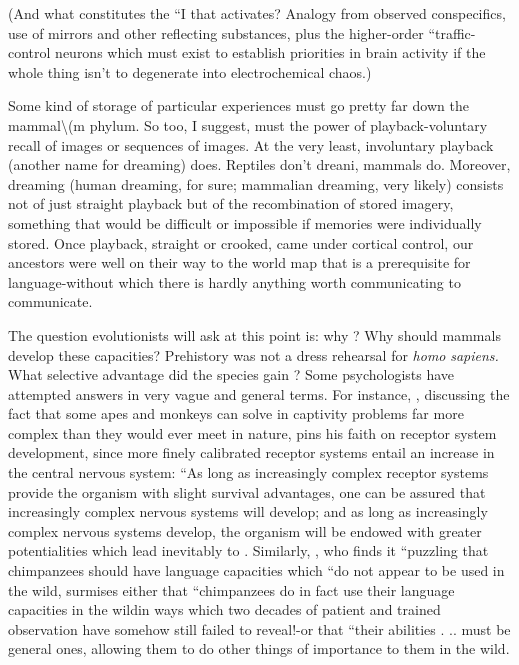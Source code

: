 (And what constitutes the ``I that activates? Analogy from observed conspecifics, use of mirrors and other reflecting substances, plus the higher-order ``traffic-control neurons which must exist to establish priorities in brain activity if the whole thing isn't to degen\-erate into electrochemical chaos.)

Some kind of  storage of particular experiences must go pretty far down the mammal{\textbackslash}(m phylum. So too, I suggest, must
the power of playback-voluntary recall of images or sequences of images. At the very least, involuntary playback (another name for dreaming) does. Reptiles don't dreani, mammals do. Moreover, dream\-ing (human dreaming, for sure; mammalian dreaming, very likely) consists not of just straight playback but of the recombination of stored imagery, something that would be difficult or impossible if memories were individually stored. Once playback, straight or crooked, came under cortical control, our ancestors were well on their way to the world map that is a prerequisite for language-without which there is hardly anything worth communicating to communicate.

The question evolutionists will ask at this point is: why ? Why should mammals develop these capacities? Prehistory was not a dress rehearsal for \textit{homo} \textit{sapiens.} What selective advantage did the species gain ? Some psychologists have attempted answers in very vague and general terms. For instance, \citet{Harlow1958}, discussing the fact that some apes and monkeys can solve in captivity problems far more complex than they would ever meet in nature, pins his faith on receptor system development, since more finely calibrated receptor systems entail an increase in the central nervous system: ``As long as increas\-ingly complex receptor systems provide the organism with slight survival advantages, one can be assured that increasingly complex nervous systems will develop; and as long as increasingly complex
nervous systems develop, the organism will be endowed with greater
potentialities which lead inevitably to . Similarly, \citet{Passingham1979}, who finds it ``puzzling that chimpanzees should have language capacities which ``do not appear to be used in the wild, surmises either that ``chimpanzees do in fact use their language capacities in the wild{\textquotedbl}\-in ways which two decades of patient and trained observation have somehow still failed to reveal!{}-or that ``their abilities . .. must be general ones, allowing them to do other things of importance to them in the wild.{\textquotedbl}

